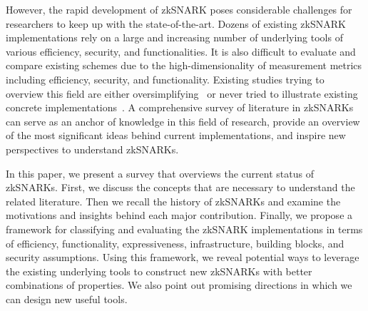\documentclass[acmlarge]{acmart}
\theoremstyle{plain}
\theoremstyle{definition}
\theoremstyle{remark}
\begin{document}
However, the rapid development of zkSNARK poses considerable challenges for researchers to keep up with the state-of-the-art.
Dozens of existing zkSNARK implementations rely on a large and increasing number of underlying tools of various efficiency, security, and functionalities.
It is also difficult to evaluate and compare existing schemes due to the high-dimensionality of measurement metrics including efficiency, security, and functionality.
Existing studies trying to overview this field are either oversimplifying~\cite{Nitulescu19, WalfishB15} or never tried to illustrate existing concrete implementations~\cite{ZKProof20}.
A comprehensive survey of literature in zkSNARKs can serve as an anchor of knowledge in this field of research, provide an overview of the most significant ideas behind current implementations, and inspire new perspectives to understand zkSNARKs.


In this paper, we present a survey that overviews the current status of zkSNARKs.
First, we discuss the concepts that are necessary to understand the related literature.
Then we recall the history of zkSNARKs and examine the motivations and insights behind each major contribution.
Finally, we propose a framework for classifying and evaluating the zkSNARK implementations in terms of efficiency, functionality, expressiveness, infrastructure, building blocks, and security assumptions.
Using this framework, we reveal potential ways to leverage the existing underlying tools to construct new zkSNARKs with better combinations of properties.
We also point out promising directions in which we can design new useful tools.
\end{document}
